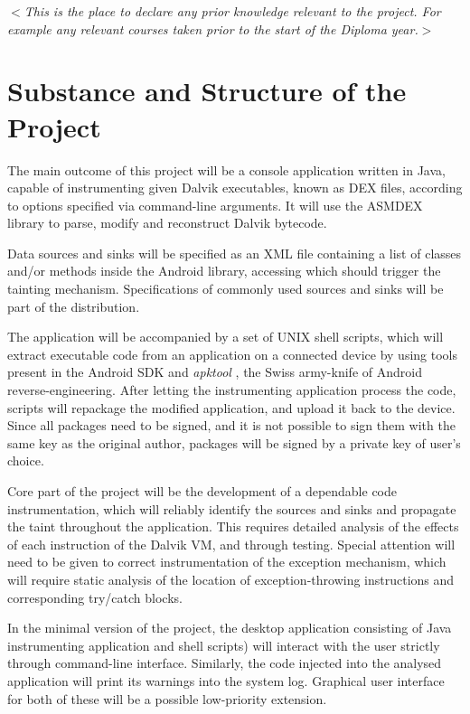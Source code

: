 \documentclass[12pt]{article}
\newcommand{\al}{$<$}
\newcommand{\ar}{$>$}
\begin{document}
\al\emph{This is the place to declare any prior knowledge relevant to
  the project.  For example any relevant courses taken prior to the
  start of the Diploma year.}\ar


\section*{Substance and Structure of the Project}

The main outcome of this project will be a console application written 
in Java, capable of instrumenting given Dalvik executables, known as DEX
files, according to options specified via command-line arguments. It will
use the ASMDEX \cite{asm.ow2.org/asmdex-index.html} library to parse, 
modify and reconstruct Dalvik bytecode. 

Data sources and sinks will be specified as an XML file containing a list
of classes and/or methods inside the Android library, accessing which
should trigger the tainting mechanism. Specifications of commonly used 
sources and sinks will be part of the distribution.

The application will be accompanied by a set of UNIX shell scripts, which 
will extract executable code from an application on a connected device 
by using tools present in the Android SDK and \emph{apktool} 
\cite{code.google.com/p/android-apktool}, the Swiss army-knife of
Android reverse-engineering. After letting the instrumenting application
process the code, scripts will repackage the modified application, and 
upload it back to the device. Since all packages need to be signed, and
it is not possible to sign them with the same key as the original author,
packages will be signed by a private key of user's choice.

Core part of the project will be the development of a dependable code 
instrumentation, which will reliably identify the sources and sinks and
propagate the taint throughout the application. This requires detailed
analysis of the effects of each instruction of the Dalvik VM, and through
testing. Special attention will need to be given to correct 
instrumentation of the exception mechanism, which will require static 
analysis of the location of exception-throwing instructions and 
corresponding try/catch blocks.

In the minimal version of the project, the desktop application consisting of
Java instrumenting application and shell scripts) will interact with the user
strictly through command-line interface. Similarly, the code injected into 
the analysed application will print its warnings into the system log. 
Graphical user interface for both of these will be a possible low-priority 
extension.
\end{document}

